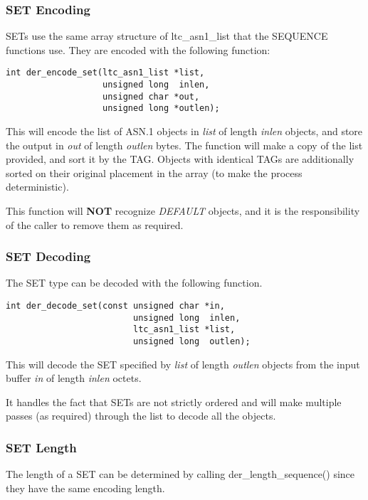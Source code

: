 \documentclass[synpaper]{book}
\begin{document}
\subsubsection{SET Encoding}

SETs use the same array structure of ltc\_asn1\_list that the SEQUENCE functions use.  They are encoded with the following function:

\begin{verbatim}
int der_encode_set(ltc_asn1_list *list,
                   unsigned long  inlen,
                   unsigned char *out,
                   unsigned long *outlen);
\end{verbatim}

This will encode the list of ASN.1 objects in \textit{list} of length \textit{inlen} objects, and store the output in \textit{out} of length \textit{outlen} bytes.
The function will make a copy of the list provided, and sort it by the TAG.  Objects with identical TAGs are additionally sorted on their original placement in the
array (to make the process deterministic).

This function will \textbf{NOT} recognize \textit{DEFAULT} objects, and it is the responsibility of the caller to remove them as required.

\subsubsection{SET Decoding}

The SET type can be decoded with the following function.

\begin{verbatim}
int der_decode_set(const unsigned char *in,
                         unsigned long  inlen,
                         ltc_asn1_list *list,
                         unsigned long  outlen);
\end{verbatim}

This will decode the SET specified by \textit{list} of length \textit{outlen} objects from the input buffer \textit{in} of length \textit{inlen} octets.

It handles the fact that SETs are not strictly ordered and will make multiple passes (as required) through the list to decode all the objects.

\subsubsection{SET Length}
The length of a SET can be determined by calling der\_length\_sequence() since they have the same encoding length.
\end{document}
